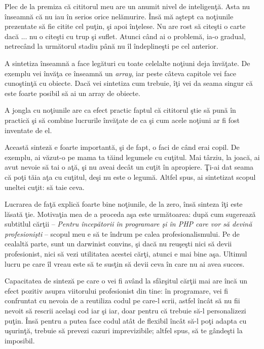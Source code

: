 Plec de la premiza că cititorul meu are un anumit nivel de inteligenţă.
Asta nu înseamnă că nu iau în serios orice nelămurire. Însă mă aştept
ca noţiunile prezentate să fie citite cel puţin, şi apoi înţelese.
Nu are rost să citeşti o carte dacă ... nu o citeşti cu trup şi suflet.
Atunci când ai o problemă, ia-o gradual, netrecând la următorul stadiu
până nu îl îndeplineşti pe cel anterior.


A sintetiza înseamnă a face legături cu toate celelalte noţiuni
deja învăţate. De exemplu vei învăţa ce înseamnă un \textsl{array}, iar peste
câteva capitole vei face cunoştinţă cu obiecte. Dacă vei sintetiza
cum trebuie, îţi vei da seama singur că este foarte posibil
să ai un array de obiecte.

A jongla cu noţiunile are ca efect practic faptul că cititorul ştie
să pună în practică şi să combine lucrurile învăţate de ca şi cum
acele noţiuni ar fi fost inventate de el.


Această sinteză e foarte importantă, şi de fapt, o faci de când erai
copil. De exemplu, ai văzut-o pe mama ta tăind legumele cu cuţitul.
Mai târziu, la joacă, ai avut nevoie să tai o aţă, şi nu aveai decât
un cuţit în apropiere. Ţi-ai dat seama că poţi tăia aţa cu cuţitul,
deşi nu este o legumă. Altfel spus, ai sintetizat scopul uneltei
{\glqq}cuţit{\grqq}: să taie ceva.

Lucrarea de faţă explică foarte bine noţiunile, de la zero, însă
sinteza îţi este lăsată ţie. Motivaţia mea de a proceda aşa este următoarea:
după cum sugerează subtitlul cărţii -- \textit{Pentru începătorii în programare şi în PHP care vor să devină profesionişti} -- scopul meu e să te îndrum pe calea profesionalismului.
Pe de cealaltă parte, sunt un darwinist convins, şi dacă nu reuşeşti
nici să devii profesionist, nici să vezi utilitatea acestei cărţi, atunci
e mai bine aşa. Ultimul lucru pe care îl vreau este să te susţin
să devii ceva în care nu ai avea succes.

Capacitatea de sinteză pe care o vei fi având la sfârşitul cărţii
mai are încă un efect pozitiv asupra viitorului profesionist din tine:
în programare, vei fi confruntat cu nevoia de a reutiliza codul pe care-l scrii, astfel
încât să nu fii nevoit să rescrii acelaşi cod iar şi iar, doar pentru
că trebuie să-l personalizezi puţin. Însă pentru a putea face
codul atât de flexibil încât să-l poţi adapta cu uşurinţă, trebuie
să prevezi cazuri {\glqq}imprevizibile{\grqq}; altfel spus, să te gândeşti
la imposibil.


